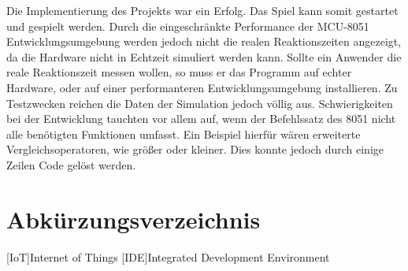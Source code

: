 \documentclass[11pt,ngerman]{report}
\begin{document}
Die Implementierung des Projekts war ein Erfolg. Das Spiel kann somit gestartet und gespielt werden. Durch die eingeschränkte Performance der MCU-8051 Entwicklungsumgebung werden jedoch nicht die realen Reaktionszeiten angezeigt, da die Hardware nicht in Echtzeit simuliert werden kann. Sollte ein Anwender die reale Reaktionszeit messen wollen, so muss er das Programm auf echter Hardware, oder auf einer performanteren Entwicklungsumgebung installieren. Zu Testzwecken reichen die Daten der Simulation jedoch völlig aus. Schwierigkeiten bei der Entwicklung tauchten vor allem auf, wenn der Befehlssatz des 8051 nicht alle benötigten Funktionen umfasst. Ein Beispiel hierfür wären erweiterte Vergleichsoperatoren, wie größer oder kleiner. Dies konnte jedoch durch einige Zeilen Code gelöst werden.


\newpage

\section*{Abkürzungsverzeichnis}

\begin{acronym}
	[IoT]{Internet of Things}
	[IDE]{Integrated Development Environment}
\end{acronym}
\end{document}
